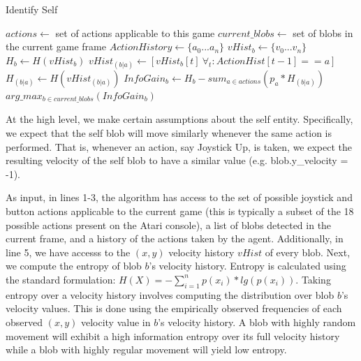 \documentclass{acm_proc_article-sp}
\begin{document}
\begin{algorithm}
\caption{Identify Self}
\label{alg:idself}
\begin{algorithmic}[1]
  \STATE $actions \leftarrow $ set of actions applicable to this game
  \STATE $current\_blobs \leftarrow $ set of blobs in the current game frame
  \STATE $ActionHistory \leftarrow \{a_0...a_n\}$ %
  \STATE $vHist_b \leftarrow \{v_0...v_n\}$ %
  \STATE $H_b \leftarrow H(vHist_b)$ 
  \STATE $vHist_{(b|a)} \leftarrow [vHist_b[t] ~\forall_t: ActionHist[t-1] == a]$ 
  \STATE $H_{(b|a)} \leftarrow H(vHist_{(b|a)})$ %
  \ENDFOR
  \STATE $InfoGain_b \leftarrow H_b - sum_{a \in actions}(p_a * H_{(b|a)})$ %
  \ENDFOR
  \RETURN $arg\_max_{b \in current\_blobs}(InfoGain_b)$ %
\end{algorithmic}
\end{algorithm}

At the high level, we make certain assumptions about the self entity. Specifically, we expect that the self blob will move similarly whenever the same action is performed. That is, whenever an action, say Joystick Up, is taken, we expect the resulting velocity of the self blob to have a similar value (e.g. blob.y\_velocity = -1). 

As input, in lines 1-3, the algorithm has access to the set of possible joystick and button actions applicable to the current game (this is typically a subset of the 18 possible actions present on the Atari console), a list of blobs detected in the current frame, and a history of the actions taken by the agent. Additionally, in line 5, we have accesss to the $(x,y)$ velocity history $vHist$ of every blob. Next, we compute the entropy of blob $b$'s velocity history. Entropy is calculated using the standard formulation: $H(X) = -\sum_{i=1}^n{p(x_i)*lg(p(x_i))}$. Taking entropy over a velocity history involves computing the distribution over blob $b$'s velocity values. This is done using the empirically observed frequencies of each observed $(x,y)$ velocity value in $b$'s velocity history. A blob with highly random movement will exhibit a high information entropy over its full velocity history while a blob with highly regular movement will yield low entropy.
\end{document}

